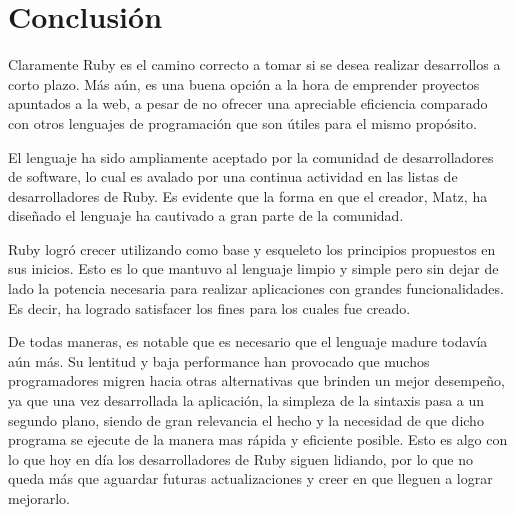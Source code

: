 \documentclass{article}
\begin{document}
\bigskip




\section{Conclusión}

	Claramente Ruby es el camino correcto a tomar si se desea realizar desarrollos a corto plazo. Más aún, es una buena opción a la hora de emprender proyectos apuntados a la web, a pesar de no ofrecer una apreciable eficiencia comparado con otros lenguajes de programación que son útiles para el mismo propósito.
	\par
	El lenguaje ha sido ampliamente aceptado por la comunidad de desarrolladores de software, lo cual es avalado por una continua actividad en las listas de desarrolladores de Ruby. Es evidente que la forma en que el creador, Matz, ha diseñado el lenguaje ha cautivado a gran parte de la comunidad.
	\par
	Ruby logró crecer utilizando como base y esqueleto los principios propuestos en sus inicios. Esto es lo que mantuvo al lenguaje limpio y simple pero sin dejar de lado la potencia necesaria para realizar aplicaciones con grandes funcionalidades. Es decir, ha logrado satisfacer los fines para los cuales fue creado.
	\par
	De todas maneras, es notable que es necesario que el lenguaje madure todavía aún más. Su lentitud y baja performance han provocado que muchos programadores migren hacia otras alternativas que brinden un mejor desempeño, ya que una vez desarrollada la aplicación, la simpleza de la sintaxis pasa a un segundo plano, siendo de gran relevancia el hecho y la necesidad de que dicho programa se ejecute de la manera mas rápida y eficiente posible. Esto es algo con lo que hoy en día los desarrolladores de Ruby siguen lidiando, por lo que no queda más que aguardar futuras actualizaciones y creer en que lleguen a lograr mejorarlo.
\end{document}
